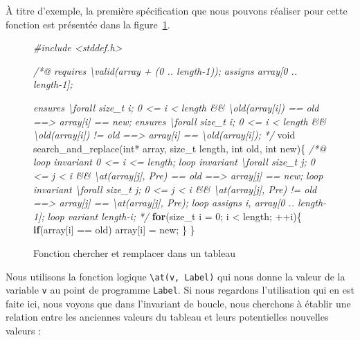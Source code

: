 \documentclass[12pt,francais,]{scrbook}
\newenvironment{Shaded}{}{}
\newcommand{\KeywordTok}[1]{\textcolor[rgb]{0.00,0.44,0.13}{\textbf{{#1}}}}
\newcommand{\DataTypeTok}[1]{\textcolor[rgb]{0.56,0.13,0.00}{{#1}}}
\newcommand{\DecValTok}[1]{\textcolor[rgb]{0.25,0.63,0.44}{{#1}}}
\newcommand{\CommentTok}[1]{\textcolor[rgb]{0.38,0.63,0.69}{\textit{{#1}}}}
\newcommand{\NormalTok}[1]{{#1}}
\begin{document}
À titre d'exemple, la première spécification que nous pouvons réaliser
pour cette fonction est présentée dans la figure~\ref{fig:4-4-2-2-sar}.

\begin{figure}[htbp]
  \centering
\begin{footnotesize}\begin{Shaded}
\begin{Highlighting}[]
\CommentTok{#include <stddef.h>}

\CommentTok{/*@}
\CommentTok{  requires \textbackslash{}valid(array + (0 .. length-1));}
\CommentTok{  assigns array[0 .. length-1];}

\CommentTok{  ensures \textbackslash{}forall size_t i; 0 <= i < length && \textbackslash{}old(array[i]) == old}
\CommentTok{             ==> array[i] == new;}
\CommentTok{  ensures \textbackslash{}forall size_t i; 0 <= i < length && \textbackslash{}old(array[i]) != old }
\CommentTok{             ==> array[i] == \textbackslash{}old(array[i]);}
\CommentTok{*/}
\DataTypeTok{void} \NormalTok{search_and_replace(}\DataTypeTok{int}\NormalTok{* array, size_t length, }\DataTypeTok{int} \NormalTok{old, }\DataTypeTok{int} \NormalTok{new)\{}
  \CommentTok{/*@}
\CommentTok{    loop invariant 0 <= i <= length;}
\CommentTok{    loop invariant \textbackslash{}forall size_t j; 0 <= j < i && \textbackslash{}at(array[j], Pre) == old }
\CommentTok{                     ==> array[j] == new;}
\CommentTok{    loop invariant \textbackslash{}forall size_t j; 0 <= j < i && \textbackslash{}at(array[j], Pre) != old }
\CommentTok{                     ==> array[j] == \textbackslash{}at(array[j], Pre);}
\CommentTok{    loop assigns i, array[0 .. length-1];}
\CommentTok{    loop variant length-i;}
\CommentTok{  */}
  \KeywordTok{for}\NormalTok{(size_t i = }\DecValTok{0}\NormalTok{; i < length; ++i)\{}
    \KeywordTok{if}\NormalTok{(array[i] == old) array[i] = new;}
  \NormalTok{\}}
\NormalTok{\}}
\end{Highlighting}
\end{Shaded}\end{footnotesize}
\caption{Fonction chercher et remplacer dans un tableau}
\label{fig:4-4-2-2-sar}
\end{figure}

Nous utilisons la fonction logique
\texttt{\textbackslash{}at(v,\ Label)} qui nous donne la valeur de la
variable \texttt{v} au point de programme \texttt{Label}. Si nous
regardons l'utilisation qui en est faite ici, nous voyons que dans
l'invariant de boucle, nous cherchons à établir une relation entre les
anciennes valeurs du tableau et leurs potentielles nouvelles valeurs :
\end{document}
